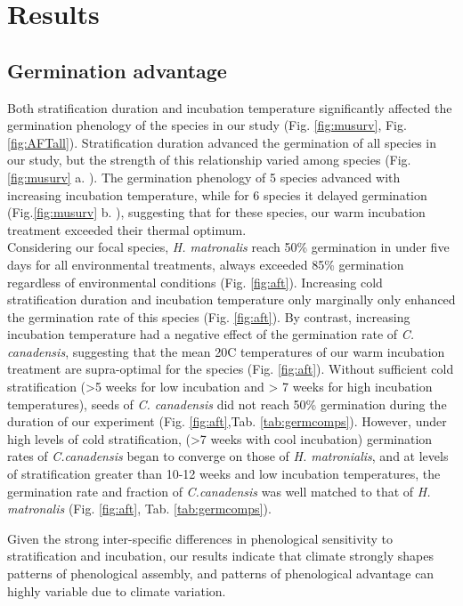 \documentclass{article}\usepackage[]{graphicx}\usepackage[]{color}
\begin{document}
\section*{Results}
\subsection*{Germination advantage}
Both stratification duration and incubation temperature significantly affected the germination phenology of the species in our study (Fig. \ref{fig:musurv}, Fig. \ref{fig:AFTall}). Stratification duration advanced the germination of all species in our study, but the strength of this relationship varied among species (Fig.\ref{fig:musurv} a. ). The germination phenology of 5 species advanced with increasing incubation temperature, while for 6 species it delayed germination (Fig.\ref{fig:musurv} b. ), suggesting that for these species, our warm incubation treatment exceeded their thermal optimum.\\

Considering our focal species, \textit{H. matronalis} reach 50\% germination in under five days for all environmental treatments, always exceeded 85\% germination regardless of environmental conditions (Fig. \ref{fig:aft}). Increasing cold stratification duration and incubation temperature only marginally only enhanced the germination rate of this species (Fig. \ref{fig:aft}). By contrast, increasing incubation temperature had a negative effect of the germination rate of \textit{C. canadensis}, suggesting that the mean 20\degree C temperatures of our warm incubation treatment are supra-optimal for the species (Fig. \ref{fig:aft}). Without sufficient cold stratification (>5 weeks for low incubation and > 7 weeks for high incubation temperatures), seeds of  \textit{C. canadensis} did not reach 50\% germination during the duration of our experiment (Fig. \ref{fig:aft},Tab. \ref{tab:germcomps}). However, under high levels of cold stratification, (>7 weeks with cool incubation) germination rates of \textit{C.canadensis} began to converge on those of \textit{H. matronialis}, and at levels of stratification greater than 10-12 weeks and low incubation temperatures, the germination rate and fraction of \textit{C.canadensis} was well matched to that of \textit{H. matronalis} (Fig. \ref{fig:aft}, Tab. \ref{tab:germcomps}).

Given the strong inter-specific differences in phenological sensitivity to stratification and incubation, our results indicate that climate strongly shapes patterns of phenological assembly, and patterns of phenological advantage can highly variable due to climate variation.
\end{document}
